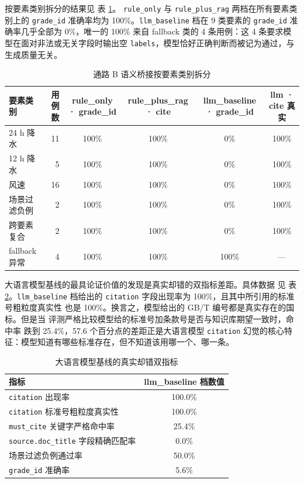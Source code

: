 \documentclass[a4paper]{article}
\newcommand{\song}{\CJKfamily{song}}
\newcommand{\wuhao}{\fontsize{10.5pt}{18pt}\selectfont}
\theoremstyle{definition}
\theoremstyle{plain}
\theoremstyle{remark}
\newcommand{\reftab}[1]{表 \ref{#1}}
\newcommand{\bk}{\discretionary{}{}{}}
\begin{document}
按要素类别拆分的结果见 \reftab{tab:bridge-by-category}。
\texttt{rule\_\bk{}only} 与 \texttt{rule\_\bk{}plus\_\bk{}rag} 两档在所有要素类别上的
\texttt{grade\_\bk{}id} 准确率均为 100\%。\texttt{llm\_\bk{}baseline} 档在
9 类要素的 \texttt{grade\_\bk{}id} 准确率几乎全部为 0\%，唯一的 100\% 来自
fallback 类的 4 条用例：这 4 条要求模型在面对非法或无关字段时输出空
\texttt{labels}，模型恰好正确判断而被记为通过，与生成质量无关。

\begin{table}[H]
    \centering
    \caption{通路 B 语义桥接按要素类别拆分}
    \label{tab:bridge-by-category}
    \song\fontsize{9pt}{12pt}\selectfont
    \renewcommand{\arraystretch}{0.95}
    \begin{tabular}{lrcccc}
        \toprule
        要素类别 & 用例数 & rule\_only · grade\_id & rule\_plus\_rag · cite & llm\_baseline · grade\_id & llm · cite 真实 \\
        \midrule
        24 h 降水 & 11 & 100\% & 100\% & 0\% & 100\% \\
        12 h 降水 & 5 & 100\% & 100\% & 0\% & 100\% \\
        风速 & 16 & 100\% & 100\% & 0\% & 100\% \\
        场景过滤负例 & 2 & 100\% & 100\% & 0\% & 100\% \\
        跨要素复合 & 2 & 100\% & 100\% & 0\% & 100\% \\
        fallback 异常 & 4 & 100\% & 100\% & 100\% & --- \\
        \bottomrule
    \end{tabular}
\end{table}

大语言模型基线的最具论证价值的发现是真实却错的双指标差距。具体数据
见 \reftab{tab:bridge-llm-trap}。\texttt{llm\_\bk{}baseline} 档给出的
\texttt{citation} 字段出现率为 100\%，且其中所引用的标准号粗粒度真实性
也是 100\%。换言之，模型给出的 GB/T 编号都是真实存在的国标。但是当
评测严格比较模型给的标准号加条款号是否与知识库期望一致时，命中率
跌到 25.4\%，57.6 个百分点的差距正是大语言模型 \texttt{citation}
幻觉的核心特征：模型知道有哪些标准存在，但不知道该用哪一个、哪一条。

\begin{table}[H]
    \centering
    \caption{大语言模型基线的真实却错双指标}
    \label{tab:bridge-llm-trap}
    \song\wuhao
    \begin{tabular}{lc}
        \toprule
        指标 & llm\_baseline 档数值 \\
        \midrule
        \texttt{citation} 出现率 & 100.0\% \\
        \texttt{citation} 标准号粗粒度真实性 & 100.0\% \\
        \texttt{must\_\bk{}cite} 关键字严格命中率 & 25.4\% \\
        \texttt{source.\bk{}doc\_\bk{}title} 字段精确匹配率 & 0.0\% \\
        场景过滤负例通过率 & 50.0\% \\
        \texttt{grade\_\bk{}id} 准确率 & 5.6\% \\
        \bottomrule
    \end{tabular}
\end{table}
\end{document}
